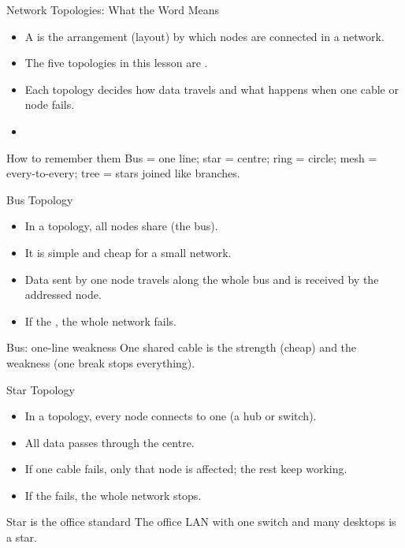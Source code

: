 \documentclass[aspectratio=169]{beamer}
\begin{document}
\begin{frame}{Network Topologies: What the Word Means}
  \begin{itemize}
    \item A  is the arrangement (layout) by which nodes are
      connected in a network.
    \item The five topologies in this lesson are .
    \item Each topology decides how data travels and what happens when one
      cable or node fails.
    \item {}
  \end{itemize}
  \begin{block}{How to remember them}
    Bus = one line; star = centre; ring = circle; mesh = every-to-every;
    tree = stars joined like branches.
  \end{block}
\end{frame}

\begin{frame}{Bus Topology}
  \begin{itemize}
    \item In a  topology, all nodes share  (the bus).
    \item It is simple and cheap for a small network.
    \item Data sent by one node travels along the whole bus and is received
      by the addressed node.
    \item If the , the whole network fails.
  \end{itemize}
  \begin{alertblock}{Bus: one-line weakness}
    One shared cable is the strength (cheap) and the weakness (one break
    stops everything).
  \end{alertblock}
\end{frame}

\begin{frame}{Star Topology}
  \begin{itemize}
    \item In a  topology, every node connects to one
       (a hub or switch).
    \item All data passes through the centre.
    \item If one cable fails, only that node is affected; the rest keep
      working.
    \item If the  fails, the whole network stops.
  \end{itemize}
  \begin{block}{Star is the office standard}
    The office LAN with one switch and many desktops is a star.
  \end{block}
\end{frame}
\end{document}
